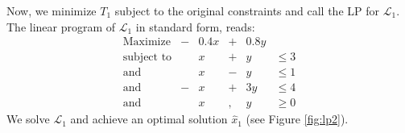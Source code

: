 \begin{comment}
\[
\begin{array}{rcl}
T_1 &=& -\left[
         \begin{array}{cc}
            1.2 & 0.6
         \end{array}
         \right]

         \left[
         \begin{array}{cc}
            1 & 0 \\ 0 & 1
         \end{array}
         \right]
         
         \left[
         \begin{array}{c}
             1.2 \\ [5pt] 0.6
         \end{array}
         \right]
         + 2
         \left[
         \begin{array}{cc}
            1.2 & 0.6
         \end{array}
         \right]
         
         \left[
         \begin{array}{cc}
            1 & 0 \\ 0 & 1
         \end{array}
         \right]
         
         \left[
         \begin{array}{c}
            x \\ y
         \end{array}
         \right] \\
         
     & & +
         \left[
         \begin{array}{cc}
            -2 & -2
         \end{array}
         \right]
         
         \left[
         \begin{array}{c}
            x \\ y
         \end{array}
         \right] \\ [15pt]
    &=& \displaystyle 0.4x - 0.8y - 1.8
\end{array}
\]
\end{comment}

Now, we minimize $T_1$ subject to the original constraints and call the LP for
$\mathcal{L}_1$.
The linear program of $\mathcal{L}_1$ in standard form, reads:
\[
\begin{array}{lcrcrl}
    \textrm{Maximize}   &-& 0.4 x &+& 0.8 y \\
    \textrm{subject to} & &     x &+&     y & \leq 3 \\
    \textrm{and}        & &     x &-&     y & \leq 1 \\
    \textrm{and}        &-&     x &+&   3 y & \leq 4 \\
    \textrm{and}        & &     x &,&     y & \geq 0
\end{array}
\]
We solve $\mathcal{L}_1$ and achieve an optimal solution $\hat{x}_1$
(see Figure \ref{fig:lp2}).

